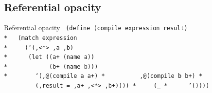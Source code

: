 \documentclass{beamer}
\begin{document}
{ %
  \begin{frame}[plain]
  \end{frame}
}

\subsection{Referential opacity}

\begin{frame}{Referential opacity}
  \texttt{
    (define (compile expression result) \\*
    \ \ (match expression \\*
    \ \ \ \ (`(,<*> ,a ,b) \\*
    \ \ \ \ \ (let ((a+ (name a)) \\*
    \ \ \ \ \ \ \ \ \ \ \ (b+ (name b))) \\*
    \ \ \ \ \ \ \ `(,@(compile a a+)\\*
    \ \ \ \ \ \ \ \ \ ,@(compile b b+)\\*
    \ \ \ \ \ \ \ \ \ (,result = ,a+ ,<*> ,b+))))\\*
    \ \ \ \ (\_\\*
    \ \ \ \ \ '())))
  }
\end{frame}
\end{document}
